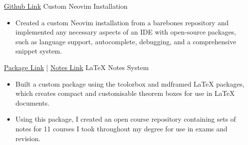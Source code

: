 \documentclass[../../cv-cs.tex]{subfiles}
\begin{document}
\cvlinkevent
{\href{https:www.github.com/leon0241/nvim-leon}{Github Link}}
{Custom Neovim Installation}
{\begin{itemize}
	\item Created a custom Neovim installation from a barebones repository and implemented any necessary aspects of an IDE with open-source packages, such as language support, autocomplete, debugging, and a comprehensive snippet system.
\end{itemize}}

\cvlinkevent
{\href{https:www.github.com/leon0241/leon-latex-thmboxes}{Package Link} | \href{https:www.github.com/leon0241/leon-latex-notes}{Notes Link}}
{LaTeX Notes System}
{\begin{itemize}
    \item Built a custom package using the tcolorbox and mdframed LaTeX packages, which creates compact and customisable theorem boxes for use in LaTeX documents.
	\item Using this package, I created an open course repository containing sets of notes for 11 courses I took throughout my degree for use in exams and revision.
\end{itemize}}
\end{document}
